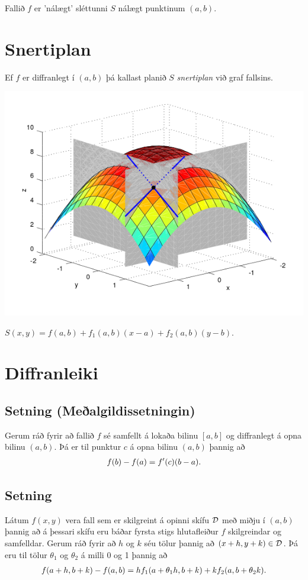 \documentclass[a4paper,10pt,icelandic]{sphinxmanual}
\begin{document}
Fallið \(f\) er ’nálægt’ sléttunni \(S\) nálægt punktinum
\((a,b)\).


\section{Snertiplan}
\label{Kafli2:index-16}\label{Kafli2:id31}
Ef \(f\) er diffranlegt í \((a,b)\) þá kallast planið \(S\)
\textit{snertiplan} við graf fallsins.

{\hfill\includegraphics[width=0.600\linewidth]{bothpart.png}\hfill}

\(S(x,y) = f(a,b) + f_1(a,b)(x-a)+f_2(a,b)(y-b)\).


\section{Diffranleiki}
\label{Kafli2:id32}

\subsection{Setning (Meðalgildissetningin)}
\label{Kafli2:index-17}\label{Kafli2:setning-mealgildissetningin}
Gerum ráð fyrir að fallið \(f\) sé samfellt á lokaða bilinu
\([a,b]\) og diffranlegt á opna bilinu \((a,b)\). Þá er til
punktur \(c\) á opna bilinu \((a,b)\) þannig að
\begin{gather}
\begin{split}\displaystyle f(b)-f(a)=f'(c)(b-a).\end{split}\notag
\end{gather}

\subsection{Setning}
\label{Kafli2:id33}
Látum \(f(x,y)\) vera fall sem er skilgreint á opinni skífu
\(\cal D\) með miðju í \((a,b)\) þannig að á þessari skífu eru
báðar fyrsta stigs hlutafleiður \(f\) skilgreindar og samfelldar.
Gerum ráð fyrir að \(h\) og \(k\) séu tölur þannig að
\((x+h, y+k)\in{\cal D}\). Þá eru til tölur \(\theta_1\) og
\(\theta_2\) á milli 0 og 1 þannig að
\begin{gather}
\begin{split}\displaystyle f(a+h,b+k)-f(a,b)=hf_1(a+\theta_1h,b+k)+kf_2(a,b+\theta_2k).\end{split}\notag
\end{gather}
\end{document}
